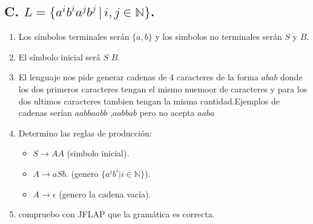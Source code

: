 \documentclass{article}
\begin{document}
        
        \newpage %
        \subsection*{C. $L = \{a^i b^i a^j b^j \, | \, i, j \in \mathbb{N}\}$.}
        \begin{flushleft}
            \begin{enumerate}
                \item Los símbolos terminales serán $\{a,b\}$ y los simbolos no terminales serán $S$ y $B$.
                \item El símbolo inicial será $S$ $B$.
                \item El lenguaje nos pide generar cadenas de 4 caracteres de la forma $abab$ donde los dos primeros caracteres tengan 
                el mismo nuemoor de caracteres y para los dos ultimos caracteres tambien tengan la misma cantidad.Ejemplos de cadenas serían $aabbaabb$ ,$aabbab$ pero no acepta $aaba$
                \item Determino las reglas de producción:
                \begin{itemize}
                    \item $S \rightarrow AA$ (simbolo inicial).
                    \item $A \rightarrow aSb$. (genero $\{a^i b^i | i \in \mathbb{N}\}$).
                    \item $A \rightarrow \epsilon$ (genero la cadena vacía).
                \end{itemize}

                \item compruebo con JFLAP que la gramática es correcta.
                


\end{enumerate}
\end{flushleft}
\end{document}
